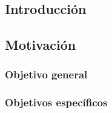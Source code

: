 \begin{otherlanguage}{spanish}

\setcounter{chapter}{0}
\setcounter{section}{0}

\chapter{Introducción}

\section{Motivación}

\subsection{Objetivo general}

\subsection{Objetivos específicos}

\end{otherlanguage}